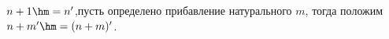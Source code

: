 
    $n+1\hm=n'$,\pau пусть определено прибавление натурального $m$, тогда положим $n+m'\hm=(n+m)'$.
